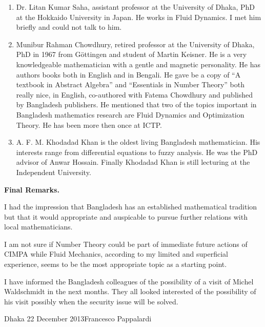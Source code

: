 \documentclass[12pt]{article}
\begin{document}
\begin{enumerate}
\item Dr. Litan Kumar Saha, assistant professor at the University of Dhaka, PhD at
the Hokkaido University in Japan. He works in Fluid Dynamics. I met him briefly and could not talk to him.
\item Munibur Rahman Chowdhury, retired professor at the University of Dhaka,
 PhD in 1967 from G\"ottingen and student of Martin Keisner. He is a very knowledgeable
mathematician with a gentle and magnetic personality. He has authors books both in English and in Bengali. He gave be a copy of ``A textbook in Abstract Algebra'' and ``Essentials in Number Theory'' both really nice, in English, co-authored with Fatema Chowdhury and published by Bangladesh publishers. He mentioned that two of the topics 
important in Bangladesh mathematics research are Fluid Dynamics and Optimization Theory. He has been more then once at ICTP.

\item A. F. M. Khodadad Khan is the oldest living Bangladesh mathematician. His interests 
range from differential equations to fuzzy analysis. He was the PhD advisor of  Anwar Hossain. Finally Khodadad Khan is still lecturing at the Independent University.
\end{enumerate}\medskip

\centerline{\textbf{Final Remarks.}}

I had the impression that Bangladesh has an established mathematical tradition but
that it would appropriate and auspicable to pursue further relations with local mathematicians.

I am not sure if Number Theory could be part of immediate future actions of CIMPA while Fluid Mechanics, according to my limited and superficial experience, seems to be the most appropriate topic as a starting point.

I have informed the Bangladesh colleagues of the possibility of a visit of Michel Waldschmidt in the next months. They  all looked interested of the possibility of
his visit possibly when the security issue will be solved.

\vfill Dhaka 22 December 2013\hfill Francesco Pappalardi
\end{document}
